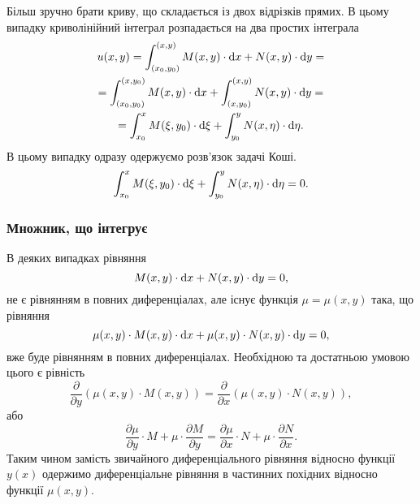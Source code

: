 Більш зручно брати криву, що складається із двох відрізків прямих. В цьому випадку криволінійний інтеграл розпадається на два простих інтеграла
\begin{multline}
	u(x, y) = \int_{(x_0, y_0)}^{(x,y)} M(x,y) \cdot \mathop{}\!\mathrm{d} x + N(x, y) \cdot \mathop{}\!\mathrm{d} y = \\
	= \int_{(x_0, y_0)}^{(x,y_0)} M(x,y) \cdot \mathop{}\!\mathrm{d} x + \int_{(x,y_0)}^{(x,y)} N(x, y) \cdot \mathop{}\!\mathrm{d} y = \\
	= \int_{x_0}^{x} M(\xi,y_0) \cdot \mathop{}\!\mathrm{d} \xi + \int_{y_0}^{y} N(x, \eta) \cdot \mathop{}\!\mathrm{d} \eta.
\end{multline}
В цьому випадку одразу одержуємо розв’язок задачі Коші.
\begin{equation*}
	\int_{x_0}^{x} M(\xi,y_0) \cdot \mathop{}\!\mathrm{d} \xi + \int_{y_0}^{y} N(x, \eta) \cdot \mathop{}\!\mathrm{d} \eta = 0.
\end{equation*}

\subsubsection{Множник, що інтегрує}
В деяких випадках рівняння
\begin{equation*}
	M(x, y) \cdot \mathop{}\!\mathrm{d} x + N(x, y) \cdot \mathop{}\!\mathrm{d} y = 0,
\end{equation*}
не є рівнянням в повних диференціалах, але існує функція $\mu = \mu(x,y)$ така, що рівняння
\begin{equation*}
	\mu(x,y) \cdot M(x, y) \cdot \mathop{}\!\mathrm{d} x + \mu(x,y) \cdot N(x, y) \cdot \mathop{}\!\mathrm{d} y = 0,
\end{equation*}
вже буде рівнянням в повних диференціалах. Необхідною та достатньою умовою цього є рівність
\begin{equation*}
	\frac{\partial}{\partial y} (\mu(x,y) \cdot M(x, y)) = \frac{\partial}{\partial x} (\mu(x,y) \cdot N(x, y)),
\end{equation*}
або
\begin{equation*}
	\frac{\partial \mu}{\partial y} \cdot M + \mu \cdot \frac{\partial M}{\partial y} = \frac{\partial \mu}{\partial x} \cdot N + \mu \cdot \frac{\partial N}{\partial x}.
\end{equation*}
Таким чином замість звичайного диференціального рівняння відносно функції $y(x)$ одержимо диференціальне рівняння в частинних похідних відносно функції $\mu(x, y)$. \\

